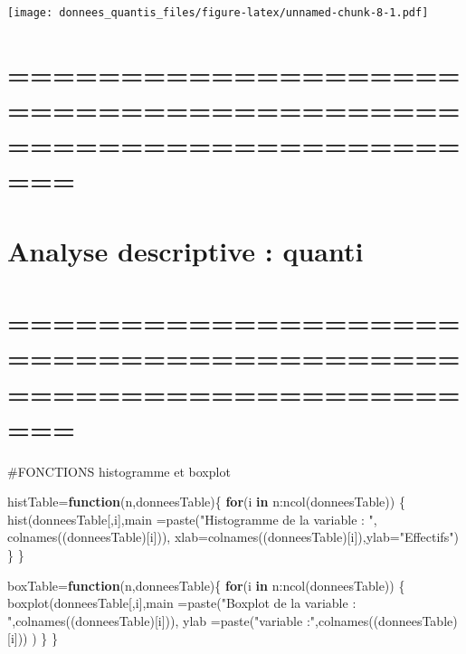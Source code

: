 \documentclass[
]{article}
\newenvironment{Shaded}{\begin{snugshade}}{\end{snugshade}}
\newcommand{\AttributeTok}[1]{\textcolor[rgb]{0.77,0.63,0.00}{#1}}
\newcommand{\CommentTok}[1]{\textcolor[rgb]{0.56,0.35,0.01}{\textit{#1}}}
\newcommand{\ControlFlowTok}[1]{\textcolor[rgb]{0.13,0.29,0.53}{\textbf{#1}}}
\newcommand{\FunctionTok}[1]{\textcolor[rgb]{0.00,0.00,0.00}{#1}}
\newcommand{\NormalTok}[1]{#1}
\newcommand{\OtherTok}[1]{\textcolor[rgb]{0.56,0.35,0.01}{#1}}
\newcommand{\SpecialCharTok}[1]{\textcolor[rgb]{0.00,0.00,0.00}{#1}}
\newcommand{\StringTok}[1]{\textcolor[rgb]{0.31,0.60,0.02}{#1}}
\begin{document}
\texttt{[image: donnees\_quantis\_files/figure-latex/unnamed-chunk-8-1.pdf]}

\begin{Shaded}
\end{Shaded}

\hypertarget{section-8}{%
\section{===============================================================}\label{section-8}}

\hypertarget{analyse-descriptive-quanti}{%
\section{Analyse descriptive :
quanti}\label{analyse-descriptive-quanti}}

\hypertarget{section-9}{%
\section{===============================================================}\label{section-9}}

\#FONCTIONS histogramme et boxplot

\begin{Shaded}
\begin{Highlighting}[]
\NormalTok{histTable}\OtherTok{=}\ControlFlowTok{function}\NormalTok{(n,donneesTable)\{}
  \ControlFlowTok{for}\NormalTok{(i }\ControlFlowTok{in}\NormalTok{ n}\SpecialCharTok{:}\FunctionTok{ncol}\NormalTok{(donneesTable)) \{}
    \FunctionTok{hist}\NormalTok{(donneesTable[,i],}\AttributeTok{main =}\FunctionTok{paste}\NormalTok{(}\StringTok{"Histogramme de la variable : "}\NormalTok{, }\FunctionTok{colnames}\NormalTok{((donneesTable)[i])),}
         \AttributeTok{xlab=}\FunctionTok{colnames}\NormalTok{((donneesTable)[i]),}\AttributeTok{ylab=}\StringTok{"Effectifs"}\NormalTok{)}
\NormalTok{    \}}
\NormalTok{\}}


\NormalTok{boxTable}\OtherTok{=}\ControlFlowTok{function}\NormalTok{(n,donneesTable)\{}
\ControlFlowTok{for}\NormalTok{(i }\ControlFlowTok{in}\NormalTok{ n}\SpecialCharTok{:}\FunctionTok{ncol}\NormalTok{(donneesTable)) \{}
  \FunctionTok{boxplot}\NormalTok{(donneesTable[,i],}\AttributeTok{main =}\FunctionTok{paste}\NormalTok{(}\StringTok{"Boxplot de la variable : "}\NormalTok{,}\FunctionTok{colnames}\NormalTok{((donneesTable)[i])),}
          \AttributeTok{ylab =}\FunctionTok{paste}\NormalTok{(}\StringTok{"variable :"}\NormalTok{,}\FunctionTok{colnames}\NormalTok{((donneesTable)[i])) )}
\NormalTok{  \}}
\NormalTok{\}}
\end{Highlighting}
\end{Shaded}
\end{document}
